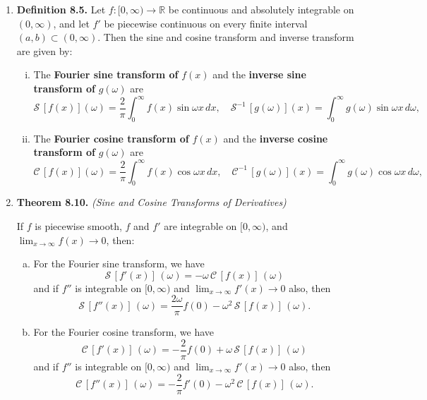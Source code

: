 \begin{enumerate}
% 
% 



\newpage


\item \textbf{Definition 8.5.} Let $f : [0, \infty) \to \mathbb{R}$ be continuous and absolutely integrable on $(0, \infty)$, and let $f '$ be piecewise continuous on every finite interval $(a, b) \subset
(0, \infty)$. Then the sine and cosine transform and inverse transform are given by:
\begin{enumerate}[(i)]
    \item The \textbf{Fourier sine transform of} $f (x)$ and the \textbf{inverse sine transform of} $g(\omega)$ are
    \[\mathcal{S}\,[f(x)](\omega)=\frac{2}{\pi} \int_{0}^{\infty}f(x)\sin\omega x \, dx, \quad \mathcal{S}^{-1}\,[g(\omega)](x)= \int_{0}^{\infty}g(\omega)\sin\omega x \, d\omega,\]
    \item The \textbf{Fourier cosine transform of} $f (x)$ and the \textbf{inverse cosine transform of} $g(\omega)$ are
    \[\mathcal{C}\,[f(x)](\omega)=\frac{2}{\pi} \int_{0}^{\infty}f(x)\cos\omega x \, dx, \quad \mathcal{C}^{-1}\,[g(\omega)](x)= \int_{0}^{\infty}g(\omega)\cos\omega x \, d\omega,\]
\end{enumerate}


\item \textbf{Theorem 8.10.} \textit{(Sine and Cosine Transforms of Derivatives)}

If $f$ is piecewise smooth, $f$ and $f ' $ are integrable on $[0, \infty)$, and $\lim _{x\to \infty} f (x) \to 0$, then:
\begin{enumerate}[(a)]
    \item For the Fourier sine transform, we have
    \[\mathcal{S}\,[f'(x)]\,(\omega) = -\omega\, \mathcal{C}\,[f(x)]\,(\omega)\]
    and if $f ''$ is integrable on $[0, \infty)$ and $\lim _{x\to \infty} f' (x) \to 0$ also, then
    \[\mathcal{S}\,[f''(x)]\,(\omega) = \frac{2\omega}{\pi}f(0) -\omega^{2} \,\mathcal{S}\,[f(x)]\,(\omega).\]
    \item For the Fourier cosine transform, we have
    \[\mathcal{C}\,[f'(x)]\,(\omega) = -\frac{2}{\pi} f(0) + \omega\, \mathcal{S}\,[f(x)]\,(\omega)\]
    and if $f ''$ is integrable on $[0, \infty)$ and $\lim _{x\to \infty} f' (x) \to 0$ also, then
    \[\mathcal{C}\,[f''(x)]\,(\omega) = -\frac{2}{\pi}f'(0) -\omega^{2} \,\mathcal{C}\,[f(x)]\,(\omega).\]
\end{enumerate}





\end{enumerate}
